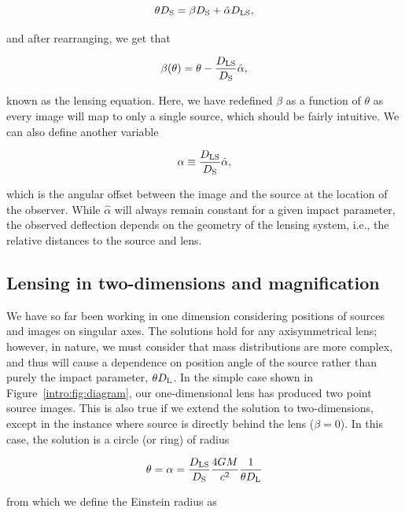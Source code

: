 \begin{equation}
\theta D_\mathrm{S} = \beta D_\mathrm{S} + \hat\alpha D_\mathrm{LS},
\end{equation}

\noindent and after rearranging, we get that

\begin{equation}
\beta(\theta) = \theta - \frac{D_\mathrm{LS}}{D_\mathrm{S}} \hat\alpha,
\end{equation}

\noindent known as the lensing equation. Here, we have redefined $\beta$ as a function of $\theta$ as every image will map to only a single source, which should be fairly intuitive. We can also define another variable

\begin{equation}
\alpha \equiv  \frac{D_\mathrm{LS}}{D_\mathrm{S}} \hat\alpha,
\label{intro:eqn:dlsds}
\end{equation}

\noindent which is the angular offset between the image and the source at the location of the observer. While $\hat\alpha$ will always remain constant for a given impact parameter, the observed deflection depends on the geometry of the lensing system, i.e., the relative distances to the source and lens.

\subsection{Lensing in two-dimensions and magnification}
\label{intro:sec:magnification}

We have so far been working in one dimension considering positions of sources and images on singular axes. The solutions hold for any axisymmetrical lens; however, in nature, we must consider that mass distributions are more complex, and thus will cause a dependence on position angle of the source rather than purely the impact parameter, $\theta D_\mathrm{L}$. In the simple case shown in Figure~\ref{intro:fig:diagram}, our one-dimensional lens has produced two point source images. This is also true if we extend the solution to two-dimensions, except in the instance where source is directly behind the lens ($\beta=0$). In this case, the solution is a circle (or ring) of radius

\begin{equation}
\theta = \alpha = \frac{D_\mathrm{LS}}{D_\mathrm{S}} \frac{4GM}{c^2} \frac{1}{\theta D_\mathrm{L}}
\end{equation} 

\noindent from which we define the Einstein radius as

